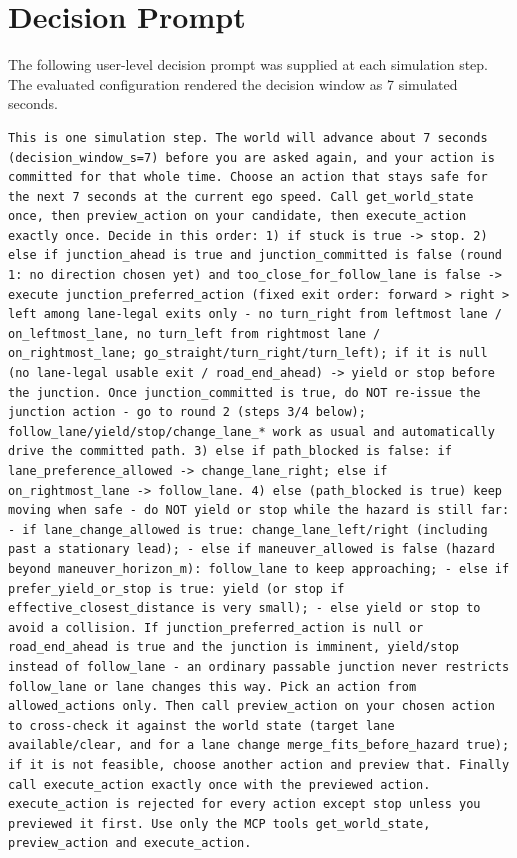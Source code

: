 \section{Decision Prompt}
\label{app:decision-prompt}
\par\medskip

The following user-level decision prompt was supplied at each simulation step.
The evaluated configuration rendered the decision window as 7 simulated
seconds.

\begin{Verbatim}[breaklines=true,breakanywhere=true,fontsize=\footnotesize]
This is one simulation step. The world will advance about 7 seconds (decision_window_s=7) before you are asked again, and your action is committed for that whole time. Choose an action that stays safe for the next 7 seconds at the current ego speed. Call get_world_state once, then preview_action on your candidate, then execute_action exactly once. Decide in this order: 1) if stuck is true -> stop. 2) else if junction_ahead is true and junction_committed is false (round 1: no direction chosen yet) and too_close_for_follow_lane is false -> execute junction_preferred_action (fixed exit order: forward > right > left among lane-legal exits only - no turn_right from leftmost lane / on_leftmost_lane, no turn_left from rightmost lane / on_rightmost_lane; go_straight/turn_right/turn_left); if it is null (no lane-legal usable exit / road_end_ahead) -> yield or stop before the junction. Once junction_committed is true, do NOT re-issue the junction action - go to round 2 (steps 3/4 below); follow_lane/yield/stop/change_lane_* work as usual and automatically drive the committed path. 3) else if path_blocked is false: if lane_preference_allowed -> change_lane_right; else if on_rightmost_lane -> follow_lane. 4) else (path_blocked is true) keep moving when safe - do NOT yield or stop while the hazard is still far: - if lane_change_allowed is true: change_lane_left/right (including past a stationary lead); - else if maneuver_allowed is false (hazard beyond maneuver_horizon_m): follow_lane to keep approaching; - else if prefer_yield_or_stop is true: yield (or stop if effective_closest_distance is very small); - else yield or stop to avoid a collision. If junction_preferred_action is null or road_end_ahead is true and the junction is imminent, yield/stop instead of follow_lane - an ordinary passable junction never restricts follow_lane or lane changes this way. Pick an action from allowed_actions only. Then call preview_action on your chosen action to cross-check it against the world state (target lane available/clear, and for a lane change merge_fits_before_hazard true); if it is not feasible, choose another action and preview that. Finally call execute_action exactly once with the previewed action. execute_action is rejected for every action except stop unless you previewed it first. Use only the MCP tools get_world_state, preview_action and execute_action.
\end{Verbatim}
